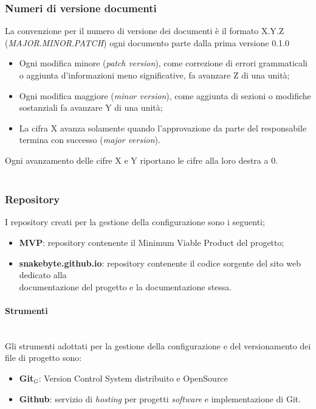 \documentclass[10pt, letterpaper]{article}
\newcommand{\trisubsection}[1]{\paragraph{#1}\mbox{}\\}
\begin{document}
\label{sec:Versionamento}
\subsubsection{Numeri di versione documenti}
La convenzione per il numero di versione dei documenti è il formato X.Y.Z (\textit{MAJOR}.\textit{MINOR}.\textit{PATCH}) ogni documento parte dalla prima versione 0.1.0
\begin{itemize}
    \item Ogni modifica minore (\textit{patch version}), come correzione di errori grammaticali o aggiunta d'informazioni meno significative, fa avanzare Z di una unità;
    \item Ogni modifica maggiore (\textit{minor version}), come aggiunta di sezioni o modifiche sostanziali fa avanzare Y di una unità;
    \item La cifra X avanza solamente quando l'approvazione da parte del responsabile termina con successo (\textit{major version}).
\end{itemize}
Ogni avanzamento delle cifre X e Y riportano le cifre alla loro destra a 0.\\ \\
\subsubsection{Repository}
I repository creati per la gestione della configurazione sono i seguenti;
\begin{itemize}
    \item \textbf{MVP}: repository contenente il Minimum Viable Product del progetto;
    \item \textbf{snakebyte.github.io}: repository contenente il codice sorgente del sito web dedicato alla\\ documentazione del progetto e la documentazione stessa.
\end{itemize}

\trisubsection{Strumenti}
Gli strumenti adottati per la gestione della configurazione e del versionamento dei file di progetto sono:
\begin{itemize}
    \item \textbf{Git}$_{G}$: Version Control System distribuito e OpenSource
    \item \textbf{Github}: servizio di \textit{hosting} per progetti \textit{software} e implementazione di Git.
\end{itemize}
\end{document}
